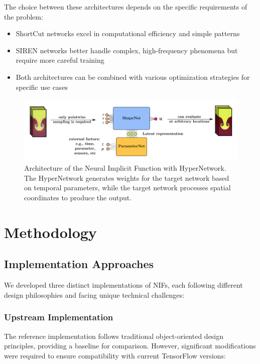 \documentclass[10pt,journal,compsoc]{IEEEtran}
\begin{document}
The choice between these architectures depends on the specific requirements of the problem:
\begin{itemize}
    \item ShortCut networks excel in computational efficiency and simple patterns
    \item SIREN networks better handle complex, high-frequency phenomena but require more careful training
    \item Both architectures can be combined with various optimization strategies for specific use cases
\end{itemize}

\begin{figure}[t]
    \centering
    \includegraphics[width=0.8\linewidth]{hypernetwork_diagram}
    \caption{Architecture of the Neural Implicit Function with HyperNetwork. The HyperNetwork generates weights for the target network based on temporal parameters, while the target network processes spatial coordinates to produce the output.}
    \label{fig:architecture}
\end{figure}

\section{Methodology}
\subsection{Implementation Approaches}
We developed three distinct implementations of NIFs, each following different design philosophies and facing unique technical challenges:

\subsubsection{Upstream Implementation}
The reference implementation follows traditional object-oriented design principles, providing a baseline for comparison. However, significant modifications were required to ensure compatibility with current TensorFlow versions:
\end{document}

